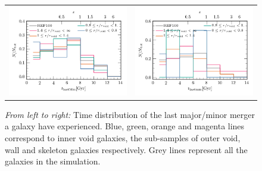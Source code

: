 \documentclass[a4paper,fleqn,usenatbib,letter]{mnras}
\begin{document}
 
 \begin{figure}	
	\begin{tabular}{cc}
	\includegraphics[width=1\columnwidth]{plots_stellarmass_central/distributionlastmajormerger_three_regions.png}  & 
	\includegraphics[width=1\columnwidth]{plots_stellarmass_central/distributionlastminormerger_three_regions.png} \\
	\end{tabular}	
    \caption{\textit{ From left to right:} Time distribution of the last major/minor merger a galaxy have experienced. Blue, green, orange and magenta lines correspond to inner void galaxies, the sub-samples of  outer void, wall and skeleton galaxies respectively. Grey lines represent all the galaxies in the simulation.}
    \label{fig:lastmergers_ssm}
\end{figure} 
\end{document}
